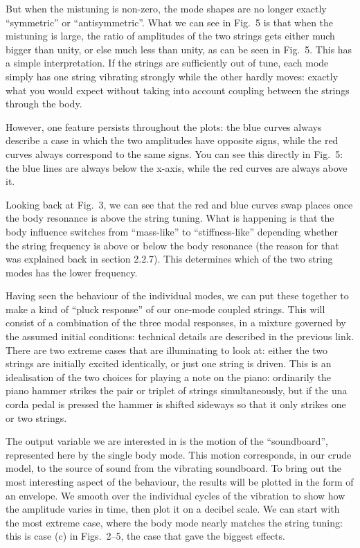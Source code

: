   

  But when the mistuning is non-zero, the mode shapes are no longer exactly 
  ``symmetric'' or ``antisymmetric''. What we can see in Fig.\ 5 is that when 
  the mistuning is large, the ratio of amplitudes of the two strings gets 
  either much bigger than unity, or else much less than unity, as can be seen 
  in Fig.\ 5. This has a simple interpretation. If the strings are sufficiently 
  out of tune, each mode simply has one string vibrating strongly while the 
  other hardly moves: exactly what you would expect without taking into account 
  coupling between the strings through the body. 

  However, one feature persists throughout the plots: the blue curves always 
  describe a case in which the two amplitudes have opposite signs, while the 
  red curves always correspond to the same signs. You can see this directly in 
  Fig.\ 5: the blue lines are always below the x-axis, while the red curves are 
  always above it. 

  Looking back at Fig.\ 3, we can see that the red and blue curves swap places 
  once the body resonance is above the string tuning. What is happening is that 
  the body influence switches from ``mass-like'' to ``stiffness-like'' 
  depending whether the string frequency is above or below the body resonance 
  (the reason for that was explained back in section 2.2.7). This determines 
  which of the two string modes has the lower frequency. 

  Having seen the behaviour of the individual modes, we can put these together 
  to make a kind of “pluck response” of our one-mode coupled strings. This will 
  consist of a combination of the three modal responses, in a mixture governed 
  by the assumed initial conditions: technical details are described in the 
  previous link. There are two extreme cases that are illuminating to look at: 
  either the two strings are initially excited identically, or just one string 
  is driven. This is an idealisation of the two choices for playing a note on 
  the piano: ordinarily the piano hammer strikes the pair or triplet of strings 
  simultaneously, but if the una corda pedal is pressed the hammer is shifted 
  sideways so that it only strikes one or two strings. 

  The output variable we are interested in is the motion of the “soundboard”, 
  represented here by the single body mode. This motion corresponds, in our 
  crude model, to the source of sound from the vibrating soundboard. To bring 
  out the most interesting aspect of the behaviour, the results will be plotted 
  in the form of an envelope. We smooth over the individual cycles of the 
  vibration to show how the amplitude varies in time, then plot it on a decibel 
  scale. We can start with the most extreme case, where the body mode nearly 
  matches the string tuning: this is case (c) in Figs.\ 2--5, the case that 
  gave the biggest effects. 

